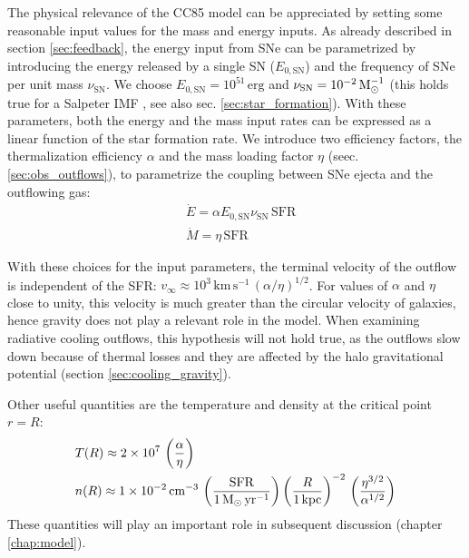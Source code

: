 The physical relevance of the CC85 model can be appreciated by setting some reasonable input values for the mass and energy inputs. As already described in section \ref{sec:feedback}, the energy input from SNe can be parametrized by introducing the energy released by a single SN ($E_{0,\mathrm{SN}}$) and the frequency of SNe per unit mass $\nu_\mathrm{SN}$. We choose $E_{0,\mathrm{SN}} = 10^{51}\,\mathrm{erg}$ \citep{ostriker_supernovae} and $\nu_\mathrm{SN} = 10^{-2}\,{\rm M}_{\odot}^{-1}$ (this holds true for a Salpeter IMF \citep{leitherer1999}, see also sec. \ref{sec:star_formation}). With these parameters, both the energy and the mass input rates can be expressed as a linear function of the star formation rate. We introduce two efficiency factors, the thermalization efficiency $\alpha$ and the mass loading factor $\eta$ (seec. \ref{sec:obs_outflows}), to parametrize the coupling between SNe ejecta and the outflowing gas:
\begin{subequations}
\begin{align}
    &\dot{E}=\alpha  E_{0,\mathrm{SN}} \nu_\mathrm{SN} \,\mathrm{SFR}\\
    & \dot{M}=\eta \, \mathrm{SFR}
\end{align}
\end{subequations}

With these choices for the input parameters, the terminal velocity of the outflow is independent of the SFR: $v_\infty \approx 10^3\,\mathrm{km}\,\mathrm{s}^{-1} \,( \alpha / \eta )^{1/2}$. For values of $\alpha$ and $\eta$ close to unity, this velocity is much greater than the circular velocity of galaxies, hence gravity does not play a relevant role in the model. When examining radiative cooling outflows, this hypothesis will not hold true, as the outflows slow down because of thermal losses and they are affected by the halo gravitational potential (section \ref{sec:cooling_gravity}). 

Other useful quantities are the temperature and density at the critical point $r=R$:
\begin{subequations}
\begin{align}
    & T(R) \approx 2\times10^7\,\left(\frac{\alpha}{\eta}\right)\\
    & n(R) \approx 1\times10^{-2}\,\mathrm{cm}^{-3}\,\left(\frac{\mathrm{SFR}}{1\,{\rm M}_{\odot}\,\mathrm{yr}^{-1}}\right) \left(\frac{R}{1\,\mathrm{kpc}}\right)^{-2}\,\left(\frac{\eta^{3/2}}{\alpha^{1/2}}\right)
\end{align}
\end{subequations}
These quantities will play an important role in subsequent discussion (chapter \ref{chap:model}). 


